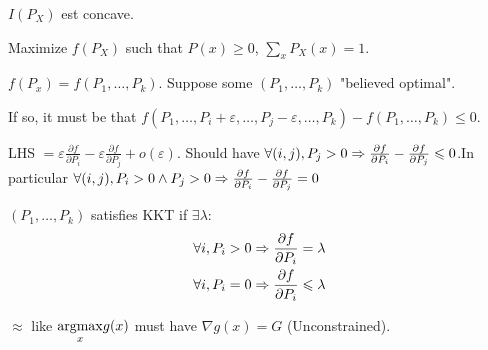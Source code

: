 \begin{theorem}
    $I(P_X)$ est concave.
\end{theorem}

Maximize $f(P_X)$ such that $P(x)\geqslant 0$, $\sum\limits_xP_X(x) = 1$.

$f(P_x) = f(P_1,\ldots,P_k)$. Suppose some $(P_1,\ldots,P_k)$ "believed optimal".

If so, it must be that $f(P_1,\ldots,P_i+\varepsilon,\ldots, P_j-\varepsilon,\ldots,P_k) - f(P_1,\ldots,P_k) \leqslant 0$.

LHS $= \varepsilon \frac{\partial f}{\partial P_i}-\varepsilon\frac{\partial f}{\partial P_j}+o(\varepsilon)$. Should have $\forall(i,j), P_j > 0 \Rightarrow \frac{\partial f}{\partial P_i}-\frac{\partial f}{\partial P_j} \leqslant 0$.In particular $\forall(i,j), P_i>0\wedge P_j > 0 \Rightarrow \frac{\partial f}{\partial P_i}-\frac{\partial f}{\partial P_j} = 0$


\begin{definition}
    $(P_1,\ldots, P_k)$ satisfies KKT if $\exists \lambda:$
    \[
        \begin{aligned}
            \forall i, P_i>0 &\Rightarrow \frac{\partial f}{\partial P_i} = \lambda\\
            \forall i, P_i=0 &\Rightarrow \frac{\partial f}{\partial P_i} \leqslant \lambda\\
        \end{aligned}    
    \]
\end{definition}

$\approx$ like $\underset{x}{\operatorname{argmax}} g(x)$ must have $\nabla g(x) = G$ (Unconstrained).

